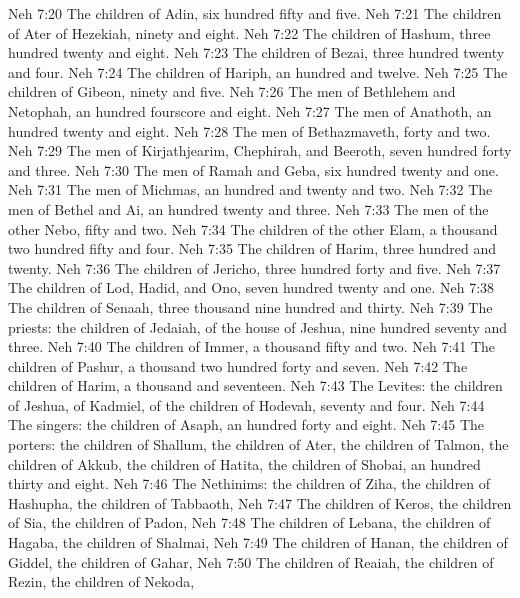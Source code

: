 \vs Neh 7:20 The children of Adin, six hundred fifty and five.
\vs Neh 7:21 The children of Ater of Hezekiah, ninety and eight.
\vs Neh 7:22 The children of Hashum, three hundred twenty and eight.
\vs Neh 7:23 The children of Bezai, three hundred twenty and four.
\vs Neh 7:24 The children of Hariph, an hundred and twelve.
\vs Neh 7:25 The children of Gibeon, ninety and five.
\vs Neh 7:26 The men of Bethlehem and Netophah, an hundred fourscore and eight.
\vs Neh 7:27 The men of Anathoth, an hundred twenty and eight.
\vs Neh 7:28 The men of Bethazmaveth, forty and two.
\vs Neh 7:29 The men of Kirjathjearim, Chephirah, and Beeroth, seven hundred forty and three.
\vs Neh 7:30 The men of Ramah and Geba, six hundred twenty and one.
\vs Neh 7:31 The men of Michmas, an hundred and twenty and two.
\vs Neh 7:32 The men of Bethel and Ai, an hundred twenty and three.
\vs Neh 7:33 The men of the other Nebo, fifty and two.
\vs Neh 7:34 The children of the other Elam, a thousand two hundred fifty and four.
\vs Neh 7:35 The children of Harim, three hundred and twenty.
\vs Neh 7:36 The children of Jericho, three hundred forty and five.
\vs Neh 7:37 The children of Lod, Hadid, and Ono, seven hundred twenty and one.
\vs Neh 7:38 The children of Senaah, three thousand nine hundred and thirty.
\vs Neh 7:39 The priests: the children of Jedaiah, of the house of Jeshua, nine hundred seventy and three.
\vs Neh 7:40 The children of Immer, a thousand fifty and two.
\vs Neh 7:41 The children of Pashur, a thousand two hundred forty and seven.
\vs Neh 7:42 The children of Harim, a thousand and seventeen.
\vs Neh 7:43 The Levites: the children of Jeshua, of Kadmiel,  of the children of Hodevah, seventy and four.
\vs Neh 7:44 The singers: the children of Asaph, an hundred forty and eight.
\vs Neh 7:45 The porters: the children of Shallum, the children of Ater, the children of Talmon, the children of Akkub, the children of Hatita, the children of Shobai, an hundred thirty and eight.
\vs Neh 7:46 The Nethinims: the children of Ziha, the children of Hashupha, the children of Tabbaoth,
\vs Neh 7:47 The children of Keros, the children of Sia, the children of Padon,
\vs Neh 7:48 The children of Lebana, the children of Hagaba, the children of Shalmai,
\vs Neh 7:49 The children of Hanan, the children of Giddel, the children of Gahar,
\vs Neh 7:50 The children of Reaiah, the children of Rezin, the children of Nekoda,
